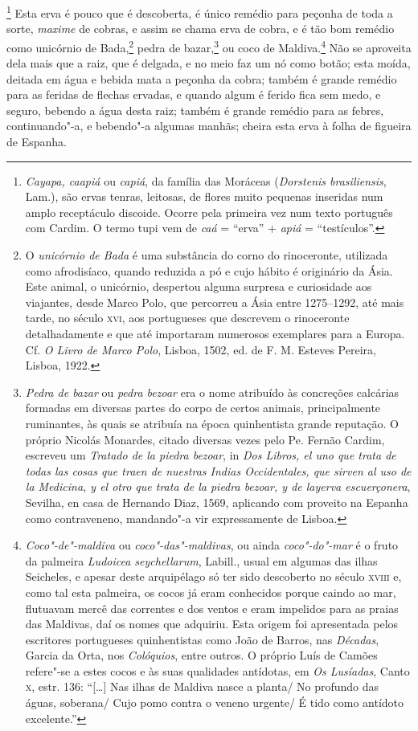 \footnote{ \textit{Cayapa, caapiá} ou \textit{capiá},
da família das Moráceas (\textit{Dorstenis brasiliensis}, Lam.), são
ervas tenras, leitosas, de flores muito pequenas inseridas num amplo
receptáculo discoide. Ocorre pela primeira vez num texto português com
Cardim. O termo tupi vem de \textit{caá} = ``erva'' + \textit{apiá} = ``testículos''.} 
Esta erva é pouco que é descoberta, é único
remédio para peçonha de toda a sorte, \textit{maxime} de cobras, e assim se chama
erva de cobra, e é tão bom remédio como unicórnio de Bada,\footnote{ O
\textit{unicórnio de Bada} é uma substância do corno do rinoceronte,
utilizada como afrodisíaco, quando reduzida a pó e cujo hábito é
originário da Ásia. Este animal, o unicórnio, despertou alguma surpresa
e curiosidade aos viajantes, desde Marco Polo, que percorreu a Ásia
entre 1275--1292, até mais tarde, no século \textsc{xvi}, aos portugueses que
descrevem o rinoceronte detalhadamente e que até importaram numerosos
exemplares para a Europa. Cf. \textit{O Livro de Marco Polo}, Lisboa,
1502, ed. de F. M. Esteves Pereira, Lisboa, 1922.} pedra de 
bazar,\footnote{ \textit{Pedra de bazar} ou \textit{pedra bezoar} era o
nome atribuído às concreções calcárias formadas em diversas partes
do corpo de certos animais, principalmente ruminantes, às quais se
atribuía na época quinhentista grande reputação. O próprio Nicolás
Monardes, citado diversas vezes pelo Pe. Fernão Cardim, escreveu um
\textit{Tratado de la piedra bezoar}, in \textit{Dos Libros, el uno que
trata de todas las cosas que traen de nuestras Indias Occidentales,
que sirven al uso de la Medicina, y el otro que trata de la piedra
bezoar, y de layerva escuerçonera}, Sevilha, en casa de Hernando Diaz,
1569, aplicando com proveito na Espanha como contraveneno,
mandando"-a vir expressamente de Lisboa.} ou coco de 
Maldiva.\footnote{ \textit{Coco"-de"-maldiva} 
ou \textit{coco"-das"-maldivas}, ou ainda
\textit{coco"-do"-mar} é o fruto da palmeira \textit{Ludoicea
seychellarum}, Labill., usual em algumas das ilhas Seicheles, e apesar
deste arquipélago só ter sido descoberto no século \textsc{xviii} e, como tal
esta palmeira, os cocos já eram conhecidos porque caindo ao mar,
flutuavam mercê das correntes e dos ventos e eram impelidos para as
praias das Maldivas, daí os nomes que adquiriu. Esta origem foi
apresentada pelos escritores portugueses quinhentistas como João de
Barros, nas \textit{Décadas}, Garcia da Orta, nos \textit{Colóquios}, 
entre outros. O próprio Luís de Camões refere"-se a estes cocos e às
suas qualidades antídotas, em \textit{Os Lusíadas}, Canto \textsc{x}, estr. 136:
 ``[\ldots{}] Nas ilhas de Maldiva nasce a planta/ No profundo das águas,
soberana/ Cujo pomo contra o veneno urgente/ É tido como antídoto
excelente.''} Não se aproveita dela mais que a raiz, que é delgada, e no
meio faz um nó como botão; esta moída, deitada em água e bebida mata a
peçonha da cobra; também é grande remédio para as feridas de flechas
ervadas, e quando algum é ferido fica sem medo, e seguro, bebendo a
água desta raiz; também é grande remédio para as febres, continuando"-a,
e bebendo"-a algumas manhãs; cheira esta erva à folha de figueira de Espanha.

